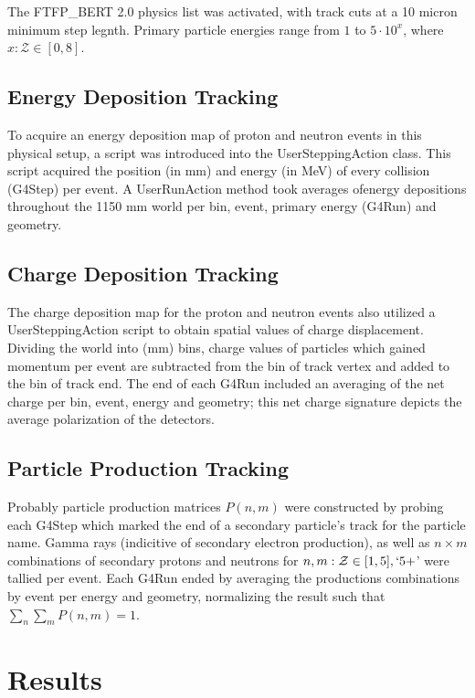 \documentclass[11pt]{article}
\begin{document}
\begin{multicols}{2}
The FTFP\_BERT 2.0 physics list was activated\cite{Geant4:physicsList}, with track cuts at a 10 micron minimum step legnth.  Primary particle energies range from $1$ to $5\cdot10^x$, where $x:\mathcal{Z}\in[0,8]$.

\subsection{Energy Deposition Tracking}

To acquire an energy deposition map of proton and neutron events in this physical setup, a script was introduced into the UserSteppingAction class.  This script acquired the position (in mm) and energy (in MeV) of every collision (G4Step) per event.  A UserRunAction method took averages ofenergy depositions throughout the 1150 mm world per bin, event, primary energy (G4Run) and geometry.

\subsection{Charge Deposition Tracking}

The charge deposition map for the proton and neutron events also utilized a UserSteppingAction script to obtain spatial values of charge displacement.  Dividing the world into (mm) bins, charge values of particles which gained momentum per event are subtracted from the bin of track vertex and added to the bin of track end.  The end of each G4Run included an averaging of the net charge per bin, event, energy and geometry; this net charge signature depicts the average polarization of the detectors.

\subsection{Particle Production Tracking}

Probably particle production matrices $P(n,m)$ were constructed by probing each G4Step which marked the end of a secondary particle's track for the particle name.  Gamma rays (indicitive of secondary electron production), as well as $n\times m$ combinations of secondary protons and neutrons for $n,m:\mathcal{Z}\in[1,5], \lq 5+$' were tallied per event.  Each G4Run ended by averaging the productions combinations by event per energy and geometry, normalizing the result such that $\sum_n \sum_m P(n,m) = 1$.

\section{Results}


\end{multicols}
\end{document}
